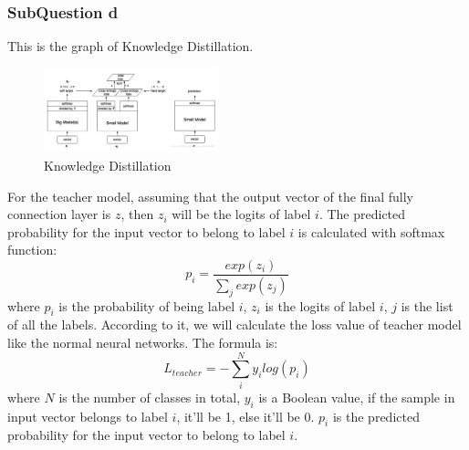\documentclass[conference]{IEEEtran}
\begin{document}
\subsubsection{SubQuestion d}
This is the graph of Knowledge Distillation.
\begin{figure}[h] 
    \centering
    \includegraphics[width=0.45\textwidth]{./graphs/KD.png}
    \caption{Knowledge Distillation}
    \label{Fig.t1q3e}
\end{figure}
For the teacher model, assuming that the output vector of the final fully connection layer is $z$, then $z_{i}$ will be the logits of label $i$. 
The predicted probability for the input vector to belong to label $i$ is calculated with softmax function:
$$p_{i}=\frac{exp(z_{i})}{\sum_{j}exp(z_{j})}$$
where $p_{i}$ is the probability of being label $i$, $z_{i}$ is the logits of label $i$, $j$ is the list of all the labels.
According to it, we will calculate the loss value of teacher model like the normal neural networks. The formula is:
$$L_{teacher}=-\sum_{i}^{N}y_{i}log(p_{i})$$
where $N$ is the number of classes in total, $y_{i}$ is a Boolean value, if the sample in input vector belongs to label $i$, it'll be 1, else it'll be 0. $p_{i}$ is the predicted probability for the input vector to belong to label $i$.
\par
\end{document}
